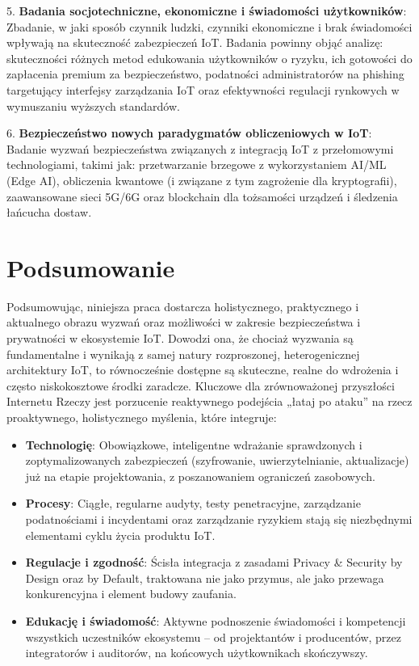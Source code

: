 5.  \textbf{Badania socjotechniczne, ekonomiczne i świadomości użytkowników}: Zbadanie, w jaki sposób czynnik ludzki, czynniki ekonomiczne i brak świadomości wpływają na skuteczność zabezpieczeń IoT. Badania powinny objąć analizę: skuteczności różnych metod edukowania użytkowników o ryzyku, ich gotowości do zapłacenia premium za bezpieczeństwo, podatności administratorów na phishing targetujący interfejsy zarządzania IoT oraz efektywności regulacji rynkowych w wymuszaniu wyższych standardów.

6.  \textbf{Bezpieczeństwo nowych paradygmatów obliczeniowych w IoT}: Badanie wyzwań bezpieczeństwa związanych z integracją IoT z przełomowymi technologiami, takimi jak: przetwarzanie brzegowe z wykorzystaniem AI/ML (Edge AI), obliczenia kwantowe (i związane z tym zagrożenie dla kryptografii), zaawansowane sieci 5G/6G oraz blockchain dla tożsamości urządzeń i śledzenia łańcucha dostaw.



\section{Podsumowanie}

Podsumowując, niniejsza praca dostarcza holistycznego, praktycznego i aktualnego obrazu wyzwań oraz możliwości w zakresie bezpieczeństwa i prywatności w ekosystemie IoT. Dowodzi ona, że chociaż wyzwania są fundamentalne i wynikają z samej natury rozproszonej, heterogenicznej architektury IoT, to równocześnie dostępne są skuteczne, realne do wdrożenia i często niskokosztowe środki zaradcze. Kluczowe dla zrównoważonej przyszłości Internetu Rzeczy jest porzucenie reaktywnego podejścia „łataj po ataku” na rzecz proaktywnego, holistycznego myślenia, które integruje:

\begin{itemize}
    \item \textbf{Technologię}: Obowiązkowe, inteligentne wdrażanie sprawdzonych i zoptymalizowanych zabezpieczeń (szyfrowanie, uwierzytelnianie, aktualizacje) już na etapie projektowania, z poszanowaniem ograniczeń zasobowych.
    \item \textbf{Procesy}: Ciągłe, regularne audyty, testy penetracyjne, zarządzanie podatnościami i incydentami oraz zarządzanie ryzykiem stają się niezbędnymi elementami cyklu życia produktu IoT.
    \item \textbf{Regulacje i zgodność}: Ścisła integracja z zasadami Privacy \& Security by Design oraz by Default, traktowana nie jako przymus, ale jako przewaga konkurencyjna i element budowy zaufania.
    \item \textbf{Edukację i świadomość}: Aktywne podnoszenie świadomości i kompetencji wszystkich uczestników ekosystemu – od projektantów i producentów, przez integratorów i auditorów, na końcowych użytkownikach skończywszy.
\end{itemize}

